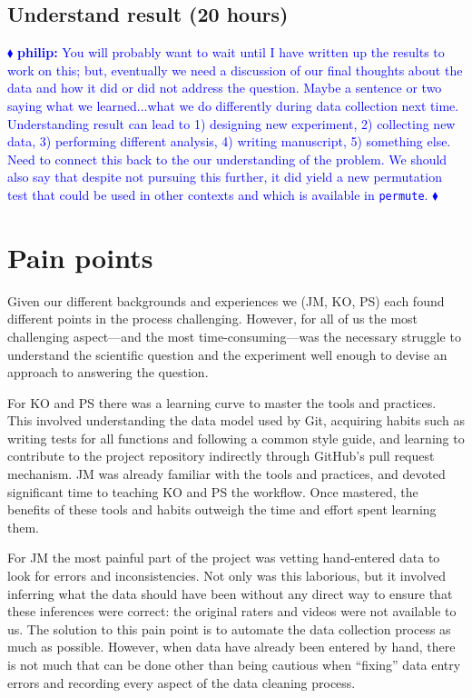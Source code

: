 \documentclass[]{article}
\newcommand{\philip}[1] { \textcolor{blue} {
\ensuremath{\blacklozenge} {\bf philip:}  {#1}
\ensuremath{\blacklozenge} } }
\begin{document}
\subsection{Understand result (20 hours)}\label{subsec:understand-result}

\philip{You will probably want to wait until I have written up the results to
work on this; but, eventually we need a discussion of our final thoughts about
the data and how it did or did not address the question.  Maybe a sentence or
two saying what we learned...what we do differently during data collection next
time.  Understanding result can lead to 1) designing new experiment, 2)
collecting new data, 3) performing different analysis, 4) writing manuscript,
5) something else.  Need to connect this back to the our understanding of the
problem.  We should also say that despite not pursuing this further, it did
yield a new permutation test that could be used in other contexts and which is
available in \texttt{permute}.  }

\section{Pain points}

Given our different backgrounds and experiences we (JM, KO, PS) each found
different points in the process challenging. 
However, for all of us the most challenging aspect---and the most 
time-consuming---was the necessary
struggle to understand the scientific question and the experiment
well enough to devise an approach to answering the question.

For KO and PS there was a learning curve to master the tools and practices.
This involved understanding the data model used by Git, acquiring habits such
as writing tests for all functions and following a common style guide, and
learning to contribute to the project repository indirectly through GitHub's
pull request mechanism.
JM was already familiar with the tools and practices, and devoted significant time
to teaching KO and PS the workflow.
Once mastered, the benefits of these tools and habits outweigh the time and effort
spent learning them.

For JM the most painful part of the project was vetting hand-entered data
to look for errors and inconsistencies.
Not only was this laborious, but it involved inferring what the data
should have been without any direct way to ensure that these inferences were
correct: the original raters and videos were not available to us.
The solution to this pain point is to automate the data collection process as
much as possible.
However, when data have already been entered by hand, there is not much that can
be done other than being cautious when ``fixing'' data entry errors and recording
every aspect of the data cleaning process.
\end{document}

